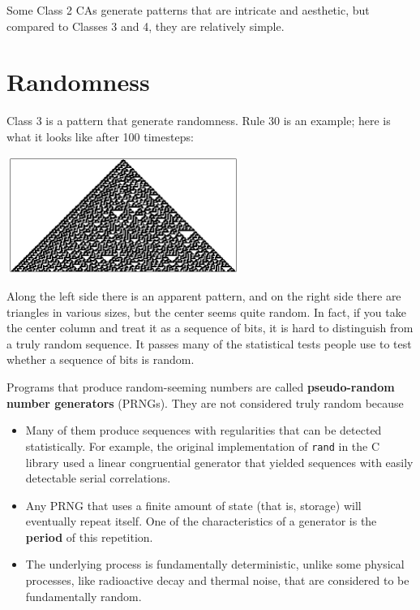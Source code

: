 \documentclass[10pt]{book}
\begin{document}
Some Class 2 CAs generate patterns that are intricate and
aesthetic, but compared to Classes 3 and 4, they are relatively
simple.


\section{Randomness}

Class 3 is a pattern that generate randomness.
Rule 30 is an example; here is what it looks like
after 100 timesteps:

\beforefig
\centerline{\includegraphics[width=3.0in,height=1.5in]{figs/rule30.eps}}
\afterfig

Along the left side there is an apparent pattern, and on the right
side there are triangles in various sizes, but the center seems
quite random.  In fact, if you take the center column and treat it as a
sequence of bits, it is hard to distinguish from a truly random
sequence.  It passes many of the statistical tests people use
to test whether a sequence of bits is random.  

Programs that produce random-seeming numbers are called
{\bf pseudo-random number generators} (PRNGs).  They are not considered
truly random because

\begin{itemize}

\item Many of them produce sequences with regularities that
can be detected statistically.  For example, the original implementation
of {\tt rand} in the C library used a linear congruential generator
that yielded sequences with easily detectable serial correlations.

\item Any PRNG that uses a finite amount
of state (that is, storage) will eventually repeat itself.  One of the
characteristics of a generator is the {\bf period} of this
repetition.

\item The underlying process is fundamentally deterministic,
unlike some physical processes, like radioactive decay and
thermal noise, that are considered to be fundamentally
random.

\end{itemize}
\end{document}
